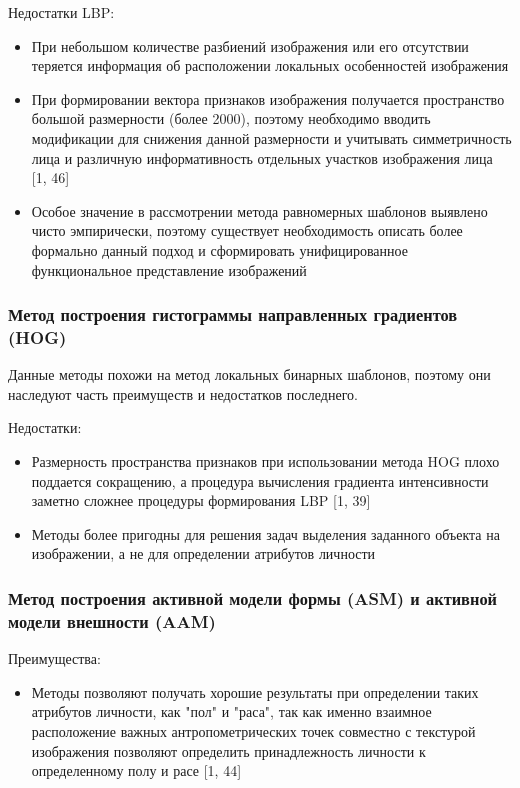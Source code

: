 \documentclass[12pt,a4paper]{article}
\begin{document}
Недостатки LBP:
\begin{itemize}
    \item При небольшом количестве разбиений изображения или его отсутствии теряется информация об расположении локальных особенностей изображения
    \item При формировании вектора признаков изображения получается пространство большой размерности (более 2000), поэтому необходимо вводить модификации для снижения данной размерности и учитывать симметричность лица и различную информативность отдельных участков изображения лица [1, 46]
    \item Особое значение в рассмотрении метода равномерных шаблонов выявлено чисто эмпирически, поэтому существует необходимость описать более формально данный подход и сформировать унифицированное функциональное представление изображений
\end{itemize}

\subsubsection{Метод построения гистограммы направленных градиентов (HOG)}
Данные методы похожи на метод локальных бинарных шаблонов, поэтому они наследуют часть преимуществ и недостатков последнего.

Недостатки:
\begin{itemize}
    \item Размерность пространства признаков при использовании метода HOG плохо поддается сокращению, а процедура вычисления градиента интенсивности заметно сложнее процедуры формирования LBP [1, 39]
    \item Методы более пригодны для решения задач выделения заданного объекта на изображении, а не для определении атрибутов личности
\end{itemize}

\subsubsection{Метод построения активной модели формы (ASM) и активной модели внешности (AAM)}
Преимущества:
\begin{itemize}
    \item Методы позволяют получать хорошие результаты при определении таких атрибутов личности, как "пол" и "раса", так как именно взаимное расположение важных антропометрических точек совместно с текстурой изображения позволяют определить принадлежность личности к определенному полу и расе [1, 44]
\end{itemize}
\end{document}
